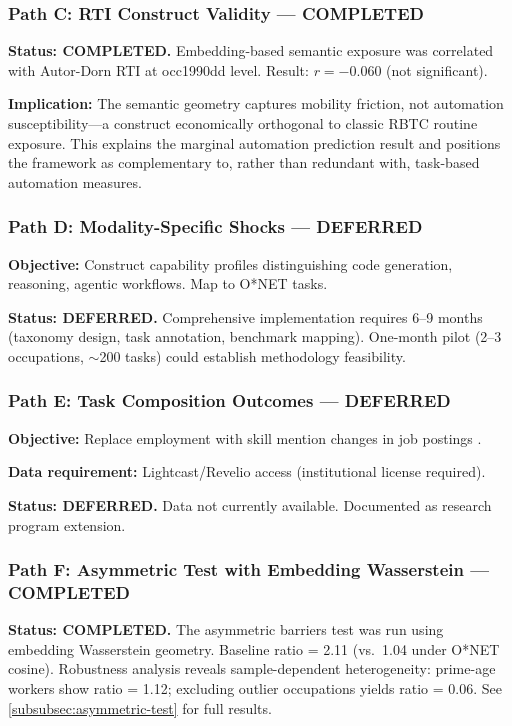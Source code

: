 \documentclass[12pt]{article}
\begin{document}
\subsubsection{Path C: RTI Construct Validity --- COMPLETED}


\textbf{Status: COMPLETED.} Embedding-based semantic exposure was correlated with Autor-Dorn RTI at occ1990dd level. Result: $r = -0.060$ (not significant).

\textbf{Implication:} The semantic geometry captures mobility friction, not automation susceptibility---a construct economically orthogonal to classic RBTC routine exposure. This explains the marginal automation prediction result and positions the framework as complementary to, rather than redundant with, task-based automation measures.


\subsubsection{Path D: Modality-Specific Shocks --- DEFERRED}


\textbf{Objective:} Construct capability profiles distinguishing code generation, reasoning, agentic workflows. Map to O*NET tasks.

\textbf{Status: DEFERRED.} Comprehensive implementation requires 6--9 months (taxonomy design, task annotation, benchmark mapping). One-month pilot (2--3 occupations, $\sim$200 tasks) could establish methodology feasibility.


\subsubsection{Path E: Task Composition Outcomes --- DEFERRED}


\textbf{Objective:} Replace employment with skill mention changes in job postings \citep{HampoleEtAl2025}.

\textbf{Data requirement:} Lightcast/Revelio access (institutional license required).

\textbf{Status: DEFERRED.} Data not currently available. Documented as research program extension.


\subsubsection{Path F: Asymmetric Test with Embedding Wasserstein --- COMPLETED}


\textbf{Status: COMPLETED.} The asymmetric barriers test was run using embedding Wasserstein geometry. Baseline ratio = 2.11 (vs.\ 1.04 under O*NET cosine). Robustness analysis reveals sample-dependent heterogeneity: prime-age workers show ratio = 1.12; excluding outlier occupations yields ratio = 0.06. See \cref{subsubsec:asymmetric-test} for full results.
\end{document}

